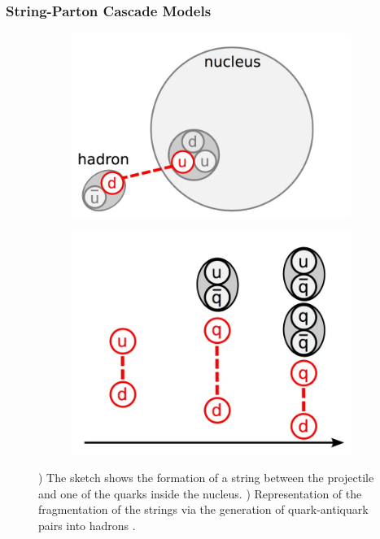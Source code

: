 \subsubsection{String-Parton Cascade Models}

\begin{figure}[htbp!]
  \centering
  \begin{subfigure}[t]{0.49\textwidth}
    \includegraphics[width=1.\linewidth]{chap4/fig/QGS_nucleus.jpeg}
    \caption{} \label{fig:QGS_nucleus}
  \end{subfigure}
  \hfill
  \begin{subfigure}[t]{0.49\textwidth}
    \includegraphics[width=1.\linewidth]{chap4/fig/QGS_stringfrag.jpeg}
    \caption{} \label{fig:QGS_string}
  \end{subfigure}
  \caption{) The sketch shows the formation of a string between the projectile and one of the quarks inside the nucleus. ) Representation of the fragmentation of the strings via the generation of quark-antiquark pairs into hadrons \cite{Feege:2011dsa}.}
\end{figure}

